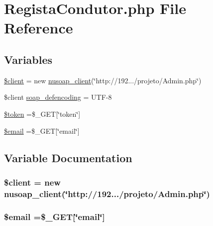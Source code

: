 \hypertarget{_regista_condutor_8php}{}\section{Regista\+Condutor.\+php File Reference}
\label{_regista_condutor_8php}
\subsection*{Variables}
\begin{DoxyCompactItemize}
\item 
\hyperlink{_regista_condutor_8php_ad1405dc1ba2e288764378e79bff7a87d}{\$client} = new \hyperlink{classnusoap__client}{nusoap\+\_\+client}(\char`\"{}http\+://192.../projeto/Admin.\+php\char`\"{})
\item 
\$client \hyperlink{_regista_condutor_8php_a944cce1b9c1aa5e93c77ace20ce99989}{soap\+\_\+defencoding} = \textquotesingle{}U\+T\+F-\/8\textquotesingle{}
\item 
\hyperlink{_regista_condutor_8php_a00ae4fcafb1145f5e968bdf920f83e2e}{\$token} =\$\+\_\+\+G\+E\+T\mbox{[}\char`\"{}token\char`\"{}\mbox{]}
\item 
\hyperlink{_regista_condutor_8php_ad634f418b20382e2802f80532d76d3cd}{\$email} =\$\+\_\+\+G\+E\+T\mbox{[}\char`\"{}email\char`\"{}\mbox{]}
\end{DoxyCompactItemize}


\subsection{Variable Documentation}
\hypertarget{_regista_condutor_8php_ad1405dc1ba2e288764378e79bff7a87d}{}
\subsubsection[{\$client}]{\setlength{\rightskip}{0pt plus 5cm}\$client = new {\bf nusoap\+\_\+client}(\char`\"{}http\+://192.../projeto/Admin.\+php\char`\"{})}\label{_regista_condutor_8php_ad1405dc1ba2e288764378e79bff7a87d}
\hypertarget{_regista_condutor_8php_ad634f418b20382e2802f80532d76d3cd}{}
\subsubsection[{\$email}]{\setlength{\rightskip}{0pt plus 5cm}\$email =\$\+\_\+\+G\+E\+T\mbox{[}\char`\"{}email\char`\"{}\mbox{]}}\label{_regista_condutor_8php_ad634f418b20382e2802f80532d76d3cd}
\hypertarget{_regista_condutor_8php_a00ae4fcafb1145f5e968bdf920f83e2e}{}
